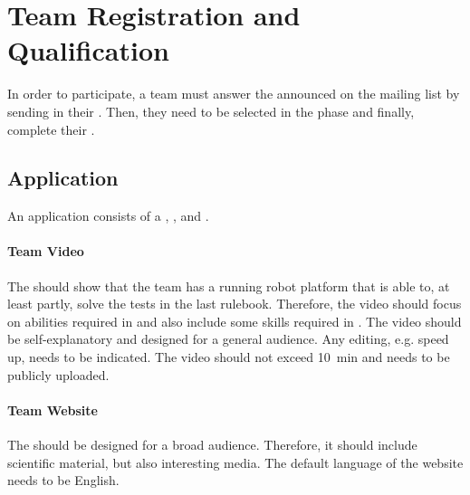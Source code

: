 \section{Team Registration and Qualification}
\label{sec:rules:particpation}

In order to participate, a team must answer the \CFP{} announced on the \AtHome{} mailing list by sending in their \Application{}. Then, they need to be selected in the \Qualification{} phase and finally, complete their \Registration{}.


\subsection{Application}
\label{sec:rules:application}

An application consists of a \TeamVideo{}, \TeamWebsite{}, and \TDP{}.

\paragraph{Team Video}
\label{sec:rules:application:video}
The \TeamVideo{} should show that the team has a running robot platform that is able to, at least partly, solve the tests in the last rulebook. Therefore, the video should focus on abilities required in \SONE{} and also include some skills required in \STWO{}. The video should be self-explanatory and designed for a general audience. Any editing, e.g. speed up, needs to be indicated. The video should not exceed \SI{10}{\minute} and needs to be publicly uploaded.


\paragraph{Team Website}
\label{sec:rules:application:website}
The \TeamWebsite{} should be designed for a broad audience. Therefore, it should include scientific material, but also interesting media. The default language of the website needs to be English.


